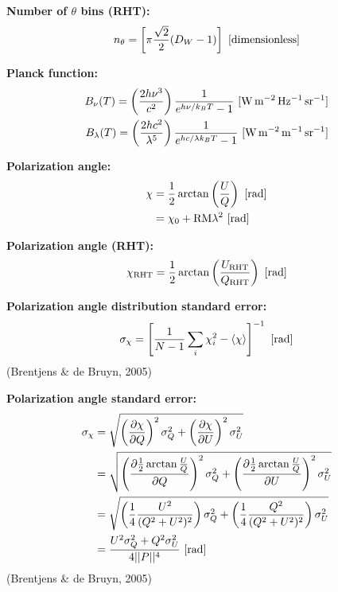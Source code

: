 \documentclass[a4paper,10pt]{article}
\begin{document}
{\noindent}\textbf{Number of $\theta$ bins (RHT):}
\begin{align*}
    n_\theta = \left[\pi\frac{\sqrt{2}}{2}(D_W-1)\right] ~ [{\rm dimensionless}]
\end{align*}

{\noindent}\textbf{Planck function:}
\begin{align*}
    B_\nu(T) = \left(\frac{2h\nu^3}{c^2}\right) \frac{1}{e^{h\nu/k_BT}-1} ~ [{\rm W\,m^{-2}\,Hz^{-1}\,sr^{-1}}] \\
    B_\lambda(T) = \left(\frac{2hc^2}{\lambda^5}\right) \frac{1}{e^{hc/\lambda k_BT}-1} ~ [{\rm W\,m^{-2}\,m^{-1}\,sr^{-1}}]
\end{align*}

{\noindent}\textbf{Polarization angle:}
\begin{align*}
\chi &= \dfrac{1}{2}\arctan\left(\dfrac{U}{Q}\right) ~ [{\rm rad}] \\
&= \chi_0 + \mathrm{RM}\lambda^2 ~ [{\rm rad}]
\end{align*}

{\noindent}\textbf{Polarization angle (RHT):}
\begin{align*}
\chi_\mathrm{RHT} = \dfrac{1}{2}\arctan\left(\dfrac{U_\mathrm{RHT}}{Q_\mathrm{RHT}}\right) ~ [{\rm rad}]
\end{align*}

{\noindent}\textbf{Polarization angle distribution standard error:} 
\begin{align*}
\sigma_\chi = \left[ \dfrac{1}{N-1} \sum_i\chi_i^2 - \langle\chi\rangle \right]^{-1} ~ [{\rm rad}]
\end{align*}
(Brentjens \& de Bruyn, 2005)

{\noindent}\textbf{Polarization angle standard error:}
\begin{align*}
\sigma_\chi &= \sqrt{ \left(\dfrac{\partial\chi}{\partial Q}\right)^2\sigma_Q^2 + \left(\dfrac{\partial\chi}{\partial U}\right)^2\sigma_U^2 }\\
&= \sqrt{ \left(\dfrac{\partial\frac{1}{2}\arctan\frac{U}{Q}}{\partial Q}\right)^2\sigma_Q^2 + \left(\dfrac{\partial\frac{1}{2}\arctan\frac{U}{Q}}{\partial U}\right)^2\sigma_U^2 } \\
&= \sqrt{ \left(\dfrac{1}{4}\dfrac{U^2}{(Q^2+U^2)^2}\right)\sigma_Q^2 + \left(\dfrac{1}{4}\dfrac{Q^2}{(Q^2+U^2)^2}\right)\sigma_U^2 } \\
&= \dfrac{U^2\sigma_Q^2 + Q^2\sigma_U^2}{4\lvert\lvert P \rvert\rvert^4} ~ [{\rm rad}]
\end{align*}
(Brentjens \& de Bruyn, 2005)
\end{document}
